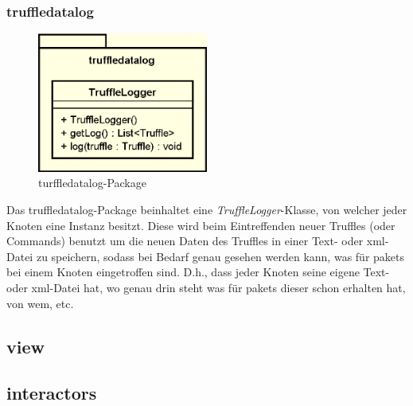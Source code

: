     \subsubsection{truffledatalog}
    \label{subsubsec:graphlog}
    
    \begin{figure}[H]
      \centering
      \includegraphics[width=0.5\textwidth]{../diagramimages/truffledatalog.png}
      \caption{turffledatalog-Package}
    \end{figure}
    
    \medskip
    Das truffledatalog-Package beinhaltet eine \textit{TruffleLogger}-Klasse, von
    welcher jeder Knoten eine Instanz besitzt. Diese wird beim Eintreffenden neuer Truffles
    (oder Commands) benutzt um die neuen Daten des Truffles in einer Text- oder xml-Datei zu speichern,
    sodass bei Bedarf genau gesehen werden kann, was für \glspl{paket} bei einem
    Knoten eingetroffen sind. D.h., dass jeder Knoten seine eigene Text- oder xml-Datei
    hat, wo genau drin steht was für \glspl{paket} dieser schon erhalten hat,
    von wem, etc.

\subsection{view}
\label{subsec:view}

\subsection{interactors}
\label{subsec:interactors}
